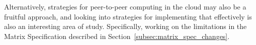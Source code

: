 Alternatively, strategies for peer-to-peer computing in the cloud may also be a fruitful approach, and looking into strategies for implementing that effectively is also an interesting area of study.
Specifically, working on the limitations in the Matrix Specification described in Section~\ref{subsec:matrix_spec_changes}.
